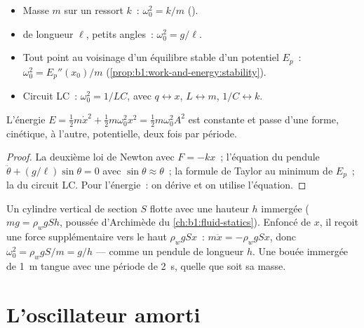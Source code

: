 \begin{proposition}\label{prop:b1:oscillators-resonance:sources}
\begin{itemize}
  \item Masse $m$ sur un ressort $k$~: $\omega_0^2 = k/m$ ().
  \item {} de longueur $\ell$, petits angles~: $\omega_0^2 = g/\ell$.
  \item Tout point au voisinage d'un équilibre stable d'un potentiel $E_p$~:
        $\omega_0^2 = E_p''(x_0)/m$ (\cref{prop:b1:work-and-energy:stability}).
  \item Circuit LC~: $\omega_0^2 = 1/LC$, avec $q \leftrightarrow x$,
        $L \leftrightarrow m$, $1/C \leftrightarrow k$.
\end{itemize}
L'énergie $E = \tfrac12 m\dot x^2 + \tfrac12 m\omega_0^2x^2 = \tfrac12
m\omega_0^2A^2$ est constante et passe d'une forme, cinétique, à
l'autre, potentielle, deux fois par période.
\end{proposition}

\begin{proof}
La deuxième loi de Newton avec $F = -kx$~; l'équation du pendule
$\ddot\theta + (g/\ell)\sin\theta = 0$ avec $\sin\theta \approx \theta$~;
la formule de Taylor au minimum de $E_p$~; la  du circuit
LC. Pour l'énergie~: on dérive et on utilise l'équation.
\end{proof}

\begin{example}\label{ex:b1:oscillators-resonance:bob}
Un cylindre vertical de section $S$ flotte avec une hauteur $h$ immergée
($mg = \rho_wgSh$, poussée d'Archimède du
\cref{ch:b1:fluid-statics}). Enfoncé de $x$, il reçoit une force
supplémentaire vers le haut $\rho_wgSx$~: $m\ddot x = -\rho_wgSx$, donc
$\omega_0^2 = \rho_wgS/m = g/h$ --- comme un pendule de longueur $h$. Une
bouée immergée de \qty{1}{m} tangue avec une période de \qty{2}{s},
quelle que soit sa masse.
\end{example}

\section{L'oscillateur amorti}

